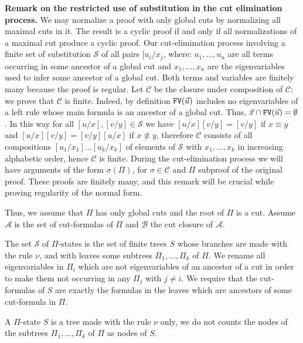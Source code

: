 \documentclass[a4paper,12pt]{article}
\newcommand{\setA}              { {\mathcal A} }
\newcommand{\setB}              { {\mathcal B} }
\newcommand{\setC}              { {\mathcal C} }
\newcommand{\setS}              { {\mathcal S} }
\newcommand{\FV}              { {\tt FV} }
\begin{document}
{\bf Remark on the restricted use of substitution in the cut elimination process.} We may normalize a proof with only global cuts by normalizing all maximal cuts in it. The result is a cyclic proof if and only if all normalizations of a maximal cut produce a cyclic proof. Our cut-elimination process involving a finite set of substitution $\setS$ of all pairs $[u_i/x_j$, where: $u_1, \ldots, u_n$ are all terms occurring in some ancestor of a global cut and $x_1, \ldots, x_n$ are the eigenvariables used to infer some ancestor of a global cut. Both terms and variables are finitely many because the proof is regular. Let $\setC$ be the closure under composition of $\setC$: we prove that $\setC$ is finite. Indeed, by definition $ \FV(\vec{u})$ includes no eigenvariables of a left rule whose main formula is an ancestor of a global cut. Thus, $\vec{x} \cap \FV(\vec{u}) = \emptyset$. In this way for all $[u/x], [v/y] \in \setS$ we have $[u/x][v/y]=[v/y]$ if $x \equiv y$ and $[u/x][v/y]=[v/y][u/x]$ if $x \not \equiv y$, therefore $\setC$ consists of all compositions $[u_1/x_1]\ldots[u_k/x_k]$ of elements of $\setS$ with $x_1, \ldots, x_k$ in increasing alphabetic order, hence $\setC$ is finite. During the cut-elimination process we will have arguments of the form $\sigma(\Pi)$, for $\sigma \in \setC$ and $\Pi$ subproof of the original proof. These proofs are finitely many, and this remark will be crucial while proving regularity of the normal form.

Thus, we assume that $\Pi$ has only global cuts and the root of $\Pi$ is a cut. Assume $\setA$ is the set of cut-formulas of $\Pi$ and $\setB$ the cut closure of $\setA$. 


The set $\setS$ of $\Pi$-states is the set of finite trees $S$ whose branches are made with the rule $\nu$, and with leaves some subtrees $\Pi_1, \ldots, \Pi_k$ of $\Pi$. We rename all eigenvariables in $\Pi_i$ which are not eigenvariables of an ancestor of a cut in order to make them not occurring in any $\Pi_j$ with $j \not = i$. We require that the cut-formulas of $S$ are exactly the formulas in the leaves which are ancestors of some cut-formula in $\Pi$. 

A $\Pi$-state $S$ is a tree made with the rule $\nu$ only, we do not counts the nodes of the subtrees $\Pi_1, \ldots, \Pi_k$ of $\Pi$ as nodes of $S$. 

\end{document}
